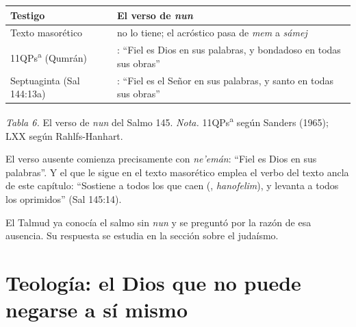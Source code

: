 \begin{center}\small\renewcommand{\arraystretch}{1.25}
\begin{tabular}{@{}L{3.6cm}L{10.8cm}@{}}
\toprule
\textbf{Testigo} & \textbf{El verso de \emph{nun}} \\ \midrule
Texto masorético & no lo tiene; el acróstico pasa de \emph{mem} a \emph{sámej} \\
11QPs\textsuperscript{a} (Qumrán) & : ``Fiel es Dios en sus palabras, y bondadoso en todas sus obras'' \\
Septuaginta (Sal 144:13a) & : ``Fiel es el Señor en sus palabras, y santo en todas sus obras'' \\
\bottomrule
\end{tabular}\par
{\footnotesize\color{gris}\textit{Tabla 6.} El verso de \emph{nun} del Salmo 145. \textit{Nota.} 11QPs\textsuperscript{a} según Sanders (1965); LXX según Rahlfs-Hanhart.}
\end{center}

El verso ausente comienza precisamente con \emph{ne'emán}: ``Fiel es Dios en sus palabras''. Y el que le sigue en el texto masorético emplea el verbo del texto ancla de este capítulo: ``Sostiene \SENOR{} a todos los que caen (, \emph{hanofelim}), y levanta a todos los oprimidos'' (Sal 145:14).


El Talmud ya conocía el salmo sin \emph{nun} y se preguntó por la razón de esa ausencia. Su respuesta se estudia en la sección sobre el judaísmo.

\section{Teología: el Dios que no puede negarse a sí mismo}

